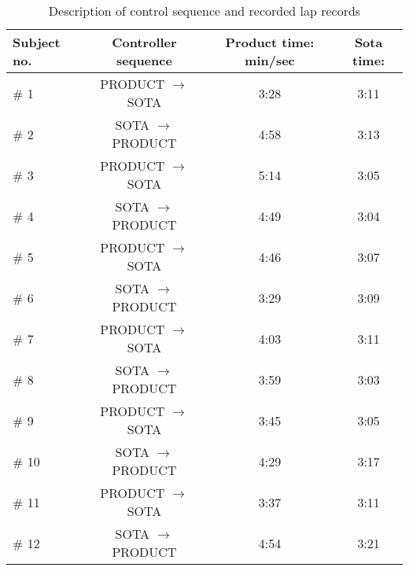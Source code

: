 \begin{table}[!htbp]
\centering
\begin{tabular}{| l | c | c | c |}
\hline
\textbf{Subject no.} & \textbf{Controller sequence} & \textbf{Product time: min/sec} & \textbf{Sota time:}\\
\hline
\# 1 & PRODUCT $ \rightarrow $ SOTA & 3:28 & 3:11\\
\# 2 & SOTA $ \rightarrow $ PRODUCT & 4:58 & 3:13\\
\# 3 & PRODUCT $ \rightarrow $ SOTA & 5:14 & 3:05\\
\# 4 & SOTA $ \rightarrow $ PRODUCT & 4:49 & 3:04\\
\# 5 & PRODUCT $ \rightarrow $ SOTA & 4:46 & 3:07\\
\# 6 & SOTA $ \rightarrow $ PRODUCT & 3:29 & 3:09\\
\# 7 & PRODUCT $ \rightarrow $ SOTA & 4:03 & 3:11\\
\# 8 & SOTA $ \rightarrow $ PRODUCT & 3:59 & 3:03\\
\# 9 & PRODUCT $ \rightarrow $ SOTA & 3:45 & 3:05\\
\# 10 & SOTA $ \rightarrow $ PRODUCT & 4:29 & 3:17\\
\# 11 & PRODUCT $ \rightarrow $ SOTA & 3:37 & 3:11\\
\# 12 & SOTA $ \rightarrow $ PRODUCT & 4:54 & 3:21\\
\hline
\end{tabular}
\caption{Description of control sequence and recorded lap records} \label{tab:timemeasurements}
\end{table}